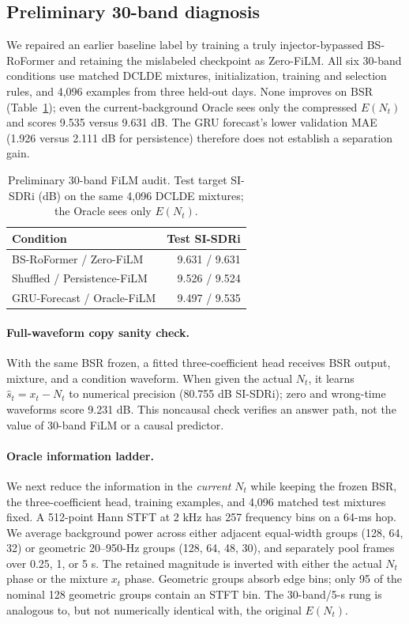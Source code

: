 \documentclass[conference]{IEEEtran}
\begin{document}
\subsection{Preliminary 30-band diagnosis}
We repaired an earlier baseline label by training a truly injector-bypassed
BS-RoFormer and retaining the mislabeled checkpoint as Zero-FiLM. All six
30-band conditions use matched DCLDE mixtures, initialization, training and
selection rules, and 4,096 examples from three held-out days. None improves
on BSR (Table~\ref{tab:cleanmain}); even the current-background Oracle sees
only the compressed $E(N_t)$ and scores 9.535 versus 9.631 dB. The GRU
forecast's lower validation MAE (1.926 versus 2.111 dB for persistence)
therefore does not establish a separation gain.

\begin{table}[t]
\caption{Preliminary 30-band FiLM audit. Test target SI-SDRi (dB) on the
same 4,096 DCLDE mixtures; the Oracle sees only $E(N_t)$.}
\label{tab:cleanmain}\centering\footnotesize
\begin{tabular}{lr}
\toprule
Condition & Test SI-SDRi\\
\midrule
BS-RoFormer / Zero-FiLM & 9.631 / 9.631\\
Shuffled / Persistence-FiLM & 9.526 / 9.524\\
GRU-Forecast / Oracle-FiLM & 9.497 / 9.535\\
\bottomrule
\end{tabular}
\end{table}

\paragraph{Full-waveform copy sanity check.}
With the same BSR frozen, a fitted three-coefficient head receives BSR output,
mixture, and a condition waveform. When given the actual $N_t$, it learns
$\hat s_t=x_t-N_t$ to numerical precision (80.755 dB SI-SDRi); zero and
wrong-time waveforms score 9.231 dB. This noncausal check verifies an answer
path, not the value of 30-band FiLM or a causal predictor.

\paragraph{Oracle information ladder.}
We next reduce the information in the \emph{current} $N_t$ while keeping the
frozen BSR, the three-coefficient head, training examples, and 4,096 matched
test mixtures fixed.  A 512-point Hann STFT at 2 kHz has 257 frequency bins
on a 64-ms hop.  We average background power across either adjacent
equal-width groups (128, 64, 32) or geometric 20--950-Hz groups
(128, 64, 48, 30), and separately pool frames over 0.25, 1, or 5 s.
The retained magnitude is inverted with either the actual $N_t$ phase or the
mixture $x_t$ phase.  Geometric groups absorb edge bins; only 95 of the
nominal 128 geometric groups contain an STFT bin.  The 30-band/5-s rung is
analogous to, but not numerically identical with, the original $E(N_t)$.
\end{document}

